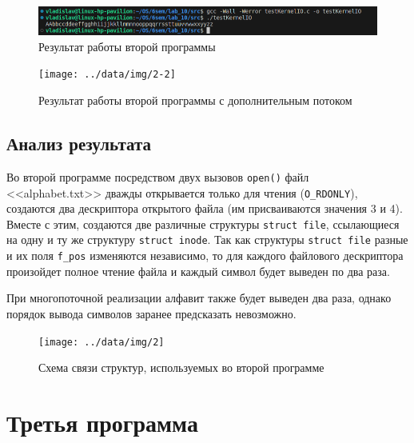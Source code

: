 \begin{figure}[ht]
	\centering
	\includegraphics[width=\textwidth]{img/2-1}
	\caption{Результат работы второй программы}
\end{figure}

\captionsetup{singlelinecheck = false, justification=raggedright}


\begin{figure}[ht]
	\centering
	\texttt{[image: ../data/img/2-2]}
	\caption{Результат работы второй программы с дополнительным потоком}
\end{figure}

\subsection{Анализ результата}

Во второй программе посредством двух вызовов \texttt{open()} файл\\ <<alphabet.txt>>
дважды открывается только для чтения (\texttt{O\_RDONLY}), создаются два дескриптора открытого
файла (им присваиваются значения 3 и 4). Вместе с этим, создаются две различные
структуры \texttt{struct file}, ссылающиеся на одну и ту же структуру
\texttt{struct~inode}. Так как структуры \texttt{struct file} разные и их поля
\texttt{f\_pos} изменяются независимо, то для каждого файлового дескриптора
произойдет полное чтение файла и каждый символ будет выведен по два
раза.

При многопоточной реализации алфавит также будет выведен два раза, однако
порядок вывода символов заранее предсказать невозможно.

\begin{figure}[ht]
	\centering
	\texttt{[image: ../data/img/2]}
	\caption{Схема связи структур, используемых во второй программе}
\end{figure}\newpage

\section{Третья программа}

\captionsetup{singlelinecheck = false, justification=raggedright}



